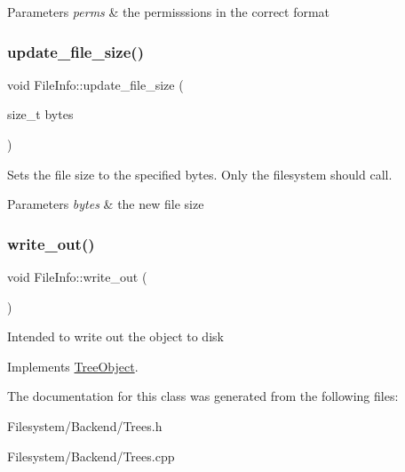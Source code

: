 \begin{DoxyParams}{Parameters}
{\em perms} & the permisssions in the correct format \\
\hline
\end{DoxyParams}
\mbox{\label{classFileInfo_a3c548a8dfcb6530bfef7551ac24ca473}} 
\subsubsection{\texorpdfstring{update\+\_\+file\+\_\+size()}{update\_file\_size()}}
{\footnotesize\ttfamily void File\+Info\+::update\+\_\+file\+\_\+size (\begin{DoxyParamCaption}\item[{size\+\_\+t}]{bytes }\end{DoxyParamCaption})}

Sets the file size to the specified bytes. Only the filesystem should call. 
\begin{DoxyParams}{Parameters}
{\em bytes} & the new file size \\
\hline
\end{DoxyParams}
\mbox{\label{classFileInfo_a8e835f000ddfd0f1097ccfa7e7801a09}} 
\subsubsection{\texorpdfstring{write\+\_\+out()}{write\_out()}}
{\footnotesize\ttfamily void File\+Info\+::write\+\_\+out (\begin{DoxyParamCaption}{ }\end{DoxyParamCaption})\hspace{0.3cm}{\ttfamily [virtual]}}

Intended to write out the object to disk 

Implements \mbox{\hyperlink{classTreeObject_a63708d61353d83e3e03597394bb7aca0}{Tree\+Object}}.



The documentation for this class was generated from the following files\+:\begin{DoxyCompactItemize}
\item 
Filesystem/\+Backend/Trees.\+h\item 
Filesystem/\+Backend/Trees.\+cpp\end{DoxyCompactItemize}
